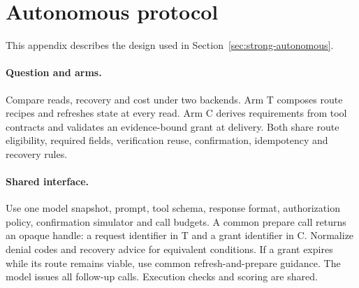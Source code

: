\section{Autonomous protocol}
\label{sec:autonomous-protocol}
This appendix describes the design used in Section~\ref{sec:strong-autonomous}.

\paragraph{Question and arms.}
Compare reads, recovery and cost under two backends. Arm T composes route recipes and refreshes state at every read. Arm C derives requirements from tool contracts and validates an evidence-bound grant at delivery. Both share route eligibility, required fields, verification reuse, confirmation, idempotency and recovery rules.

\paragraph{Shared interface.}
Use one model snapshot, prompt, tool schema, response format, authorization policy, confirmation simulator and call budgets. A common prepare call returns an opaque handle: a request identifier in T and a grant identifier in C. Normalize denial codes and recovery advice for equivalent conditions. If a grant expires while its route remains viable, use common refresh-and-prepare guidance. The model issues all follow-up calls. Execution checks and scoring are shared.

